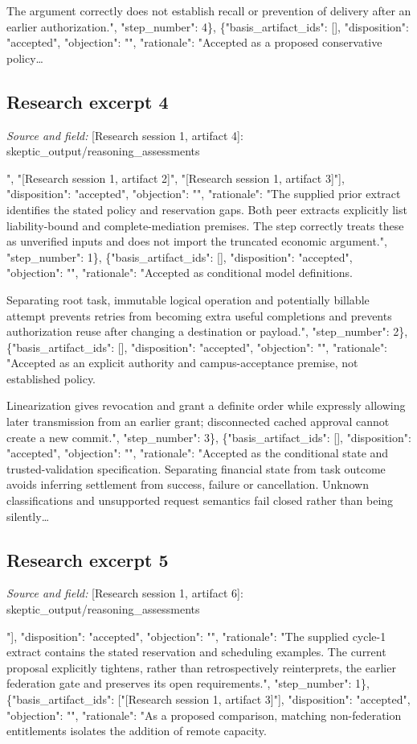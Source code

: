 \documentclass[11pt]{article}
\begin{document}
The argument correctly does not establish recall or prevention of delivery after an earlier authorization.", "step\_number": 4\}, \{"basis\_artifact\_ids": [], "disposition": "accepted", "objection": "", "rationale": "Accepted as a proposed conservative policy\ldots{}

\subsection{Research excerpt 4}
\textit{Source and field: }[Research session 1, artifact 4]: skeptic\_output/reasoning\_assessments\par
[\{"basis\_artifact\_ids": ["[Research session 1, artifact 1]", "[Research session 1, artifact 2]", "[Research session 1, artifact 3]"], "disposition": "accepted", "objection": "", "rationale": "The supplied prior extract identifies the stated policy and reservation gaps. Both peer extracts explicitly list liability-bound and complete-mediation premises. The step correctly treats these as unverified inputs and does not import the truncated economic argument.", "step\_number": 1\}, \{"basis\_artifact\_ids": [], "disposition": "accepted", "objection": "", "rationale": "Accepted as conditional model definitions.

Separating root task, immutable logical operation and potentially billable attempt prevents retries from becoming extra useful completions and prevents authorization reuse after changing a destination or payload.", "step\_number": 2\}, \{"basis\_artifact\_ids": [], "disposition": "accepted", "objection": "", "rationale": "Accepted as an explicit authority and campus-acceptance premise, not established policy.

Linearization gives revocation and grant a definite order while expressly allowing later transmission from an earlier grant; disconnected cached approval cannot create a new commit.", "step\_number": 3\}, \{"basis\_artifact\_ids": [], "disposition": "accepted", "objection": "", "rationale": "Accepted as the conditional state and trusted-validation specification. Separating financial state from task outcome avoids inferring settlement from success, failure or cancellation. Unknown classifications and unsupported request semantics fail closed rather than being silently\ldots{}

\subsection{Research excerpt 5}
\textit{Source and field: }[Research session 1, artifact 6]: skeptic\_output/reasoning\_assessments\par
[\{"basis\_artifact\_ids": ["[Research session 1, artifact 3]"], "disposition": "accepted", "objection": "", "rationale": "The supplied cycle-1 extract contains the stated reservation and scheduling examples. The current proposal explicitly tightens, rather than retrospectively reinterprets, the earlier federation gate and preserves its open requirements.", "step\_number": 1\}, \{"basis\_artifact\_ids": ["[Research session 1, artifact 3]"], "disposition": "accepted", "objection": "", "rationale": "As a proposed comparison, matching non-federation entitlements isolates the addition of remote capacity.
\end{document}
